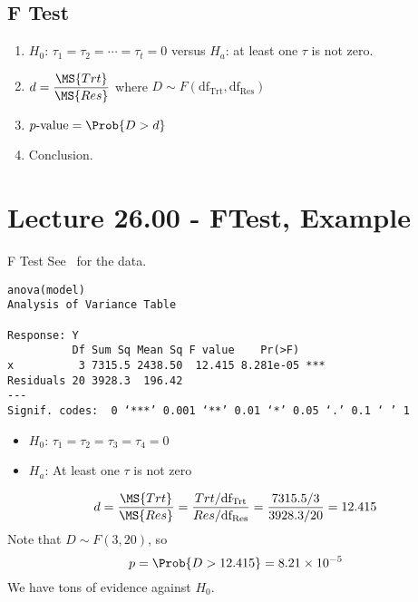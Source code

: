 \subsection*{F Test}
\begin{enumerate}[(1)]
    \item $ H_0 $: $ \tau_1=\tau_2=\cdots=\tau_t=0 $ versus $ H_a $: at least one $\tau$ is not zero.
    \item $ \displaystyle d=\frac{\MS{Trt}}{\MS{Res}}  $ where $ D \sim F(\text{df}_\text{Trt},\text{df}_\text{Res}) $
    \item $ p\text{-value}=\Prob{D>d} $
    \item Conclusion.
\end{enumerate}

\section{Lecture 26.00 - FTest, Example}
\begin{Example}{F Test}{}
    See~ for the data.
    \begin{verbatim}
anova(model)
Analysis of Variance Table

Response: Y
          Df Sum Sq Mean Sq F value    Pr(>F)    
x          3 7315.5 2438.50  12.415 8.281e-05 ***
Residuals 20 3928.3  196.42                      
---
Signif. codes:  0 ‘***’ 0.001 ‘**’ 0.01 ‘*’ 0.05 ‘.’ 0.1 ‘ ’ 1
    \end{verbatim}
    \begin{itemize}
        \item $ H_0 $: $ \tau_1=\tau_2=\tau_3=\tau_4=0 $
        \item $ H_a $: At least one $ \tau $ is not zero
    \end{itemize}
    \[ d=\frac{\MS{Trt}}{\MS{Res}} =\frac{\SS{Trt}/\text{df}_\text{Trt}}{\SS{Res}/\text{df}_\text{Res}}
        =\frac{7315.5/3}{3928.3/20}=12.415   \]
    Note that $ D \sim F(3,20) $, so
    \[ p=\Prob{D>12.415}=8.21 \times 10^{-5} \]
    We have tons of evidence against $ H_0 $.
\end{Example}
